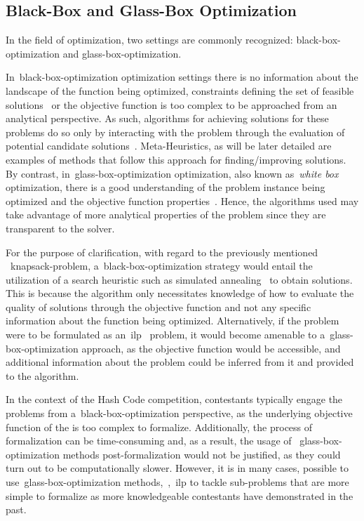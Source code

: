 \subsection{Black-Box and Glass-Box Optimization}
\label{subsec:bbo-and-gbo}

In the field of optimization, two settings are commonly recognized:
\acrfull{black-box-optimization} and \acrfull{glass-box-optimization}.

In~\acrshort{black-box-optimization} optimization settings there is no
information about the landscape of the function being optimized, constraints
defining the set of feasible solutions~\cite{alarie2021two} or the objective
function is too complex to be approached from an analytical perspective. As
such, algorithms for achieving solutions for these problems do so only by
interacting with the problem through the evaluation of potential candidate
solutions~\cite{doerr2020complexity}. Meta-Heuristics, as will be later detailed
are examples of methods that follow this approach for finding/improving
solutions. By contrast, in~\acrshort{glass-box-optimization} optimization, also
known as~\textit{white box} optimization, there is a good understanding of the
problem instance being optimized and the objective function
properties~\cite{doerr2020complexity}. Hence, the algorithms used may take
advantage of more analytical properties of the problem since they are
transparent to the solver.

For the purpose of clarification, with regard to the previously mentioned
~\acrshort{knapsack-problem}, a~\acrshort{black-box-optimization} strategy would
entail the utilization of a search heuristic such as simulated
annealing~\cite{luke2013essentialsa} to obtain solutions. This is because the
algorithm only necessitates knowledge of how to evaluate the quality of
solutions through the objective function and not any specific information about
the function being optimized. Alternatively, if the problem were to be
formulated as an~\acrfull{ilp}~\cite{nocedal2006numerical,papadimitriou1998combinatorial}
problem, it would become amenable to a~\acrshort{glass-box-optimization}
approach, as the objective function would be accessible, and additional
information about the problem could be inferred from it and provided to the
algorithm.

In the context of the Hash Code competition, contestants typically engage the
problems from a~\acrshort{black-box-optimization} perspective, as the underlying
objective function of the is too complex to formalize. Additionally, the process
of formalization can be time-consuming and, as a result, the usage of
~\acrshort{glass-box-optimization} methods post-formalization would not be
justified, as they could turn out to be computationally slower. However, it is
in many cases, possible to use~\acrshort{glass-box-optimization}
methods,~\eg{},~\acrshort{ilp} to tackle sub-problems that are more simple to
formalize as more knowledgeable contestants have demonstrated in the past.
